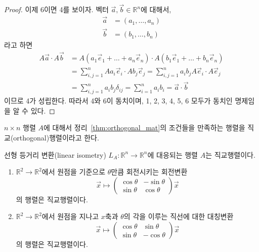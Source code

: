 \documentclass[../engineering_mathematics_lecture_note.tex]{subfiles}
\begin{document}
\begin{proof}
    이제 6이면 4를 보이자.
    벡터 $\vec a, \vec b \in \mathbb R^n$에 대해서,
    \begin{align*}
        \vec a &= (a_1, \dots, a_n)\\
        \vec b &= (b_1, \dots, b_n)
    \end{align*}
    라고 하면
    \begin{align*}
        A \vec a \cdot A \vec b &= A(a_1 \vec e_1 + \dots + a_n \vec e_n) \cdot A (b_1 \vec e_1 + \dots + b_n \vec e_n)\\
                                &= \sum_{i, j = 1}^n A a_i \vec e_i \cdot A b_j \vec e_j = \sum_{i, j = 1}^n a_i b_j A \vec e_i \cdot A \vec e_j\\
                                &= \sum_{i, j = 1}^n a_i b_j \delta_{ij} = \sum_{i = 1}^n a_i b_i = \vec a \cdot \vec b
    \end{align*}
    이므로 4가 성립한다.
    따라서 4와 6이 동치이며, 1, 2, 3, 4, 5, 6 모두가 동치인 명제임을 알 수 있다.
\end{proof}

\begin{definition} \label{def:orthogonal_mat}
    $n \times n$ 행렬 $A$에 대해서 정리~\ref{thm:orthogonal_mat}의 조건들을 만족하는 행렬을 직교(orthogonal)행렬이라고 한다.
\end{definition}

\begin{theorem}
    선형 등거리 변환(linear isometry) $L_A: \mathbb R^n \rightarrow \mathbb R^n$에 대응되는 행렬 $A$는 직교행렬이다.
\end{theorem}

\begin{example}
    \leavevmode
    \begin{enumerate}
        \item $\mathbb R^2 \rightarrow \mathbb R^2$에서 원점을 기준으로 $\theta$만큼 회전시키는 회전변환 
            \begin{equation*}
                \vec x \mapsto \begin{pmatrix}\cos \theta & -\sin \theta \\ \sin \theta & \cos \theta\end{pmatrix} \vec x
            \end{equation*}
        의 행렬은 직교행렬이다.
        \item $\mathbb R^2 \rightarrow \mathbb R^2$에서 원점을 지나고 $x$축과 $\theta$의 각을 이루는 직선에 대한 대칭변환 
            \begin{equation*}
                \vec x \mapsto \begin{pmatrix}\cos \theta & \sin \theta \\ \sin \theta & -\cos \theta\end{pmatrix} \vec x
            \end{equation*}
        의 행렬은 직교행렬이다.
    \end{enumerate}
\end{example}
\end{document}
